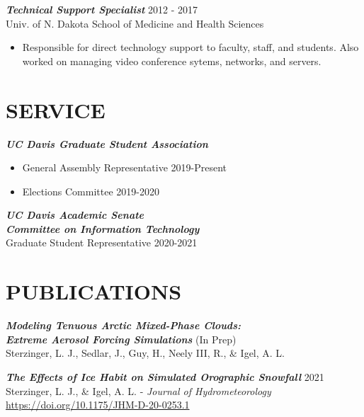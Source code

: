 \documentclass[overlapped]{res}
\begin{document}
\begin{resume}
\begin{itemize}
                \end{itemize}

                {\sl \textbf{Technical Support Specialist}} \hfill 2012 - 2017 \\
                Univ. of N. Dakota School of Medicine and Health Sciences \\
                \begin{itemize} \itemsep -2pt
                    \item Responsible  for  direct  technology  support  to  faculty,  staff,  and  students.  Also  worked  on managing video conference sytems, networks, and servers.

                \end{itemize}
\section{SERVICE}
                {\sl \textbf{UC Davis Graduate Student Association}} \\
                
                \begin{itemize}
                    \item General Assembly Representative \hfill 2019-Present
                    \item Elections Committee \hfill 2019-2020
                \end{itemize} 

                {\sl \textbf{UC Davis Academic Senate \\ Committee on Information Technology}} \\
                Graduate Student Representative \hfill 2020-2021


\section{PUBLICATIONS}

                {\sl \textbf{Modeling Tenuous Arctic Mixed-Phase Clouds:\\Extreme Aerosol Forcing Simulations}}
                \hfill (In Prep) \\ Sterzinger, L. J., Sedlar, J., Guy, H., Neely III, R., \& Igel, A. L.

                {\sl \textbf{The Effects of Ice Habit on Simulated Orographic Snowfall}} 
                \hfill 2021 \\ Sterzinger, L. J., \& Igel, A. L. - \textit{Journal of Hydrometeorology} \\ \href{https://doi.org/10.1175/JHM-D-20-0253.1}{https://doi.org/10.1175/JHM-D-20-0253.1}


\end{resume}
\end{document}
